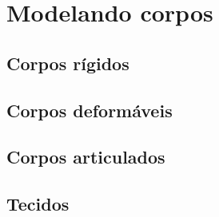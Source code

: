 \chapter{Modelando corpos}

\section{Corpos rígidos}

\section{Corpos deformáveis}

\section{Corpos articulados}

\section{Tecidos}

